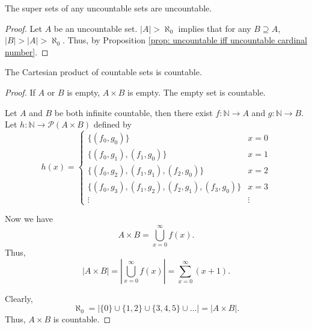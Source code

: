 \begin{proposition}
	The super sets of any uncountable sets are uncountable.
	
	\begin{proof}
		Let $A$ be an uncountable set. $|A| > \aleph_0$ implies that for any $B \supseteq A$, $|B| > |A| > \aleph_0$. Thus, by Proposition \ref{prop: uncountable iff uncountable cardinal number}.
	\end{proof}
\end{proposition}


\begin{proposition}
	\label{prop: The Cartesian product of countable sets is countable}
    The Cartesian product of countable sets is countable.
    
    \begin{proof}
    	If $A$ or $B$ is empty, $A \times B$ is empty. The empty set is countable.
    	
    	Let $A$ and $B$ be both infinite countable, then there exist $f: \mathbb N \to A$ and $g: \mathbb N \to B$. Let $h: \mathbb N \to \mathcal P(A \times B)$ defined by
    	$$
        h(x) =
        \begin{cases}
        \{(f_0, g_0)\} & x = 0 \\
        \{(f_0, g_1), (f_1, g_0)\} & x = 1 \\
        \{(f_0, g_2), (f_1, g_1), (f_2, g_0)\} & x = 2 \\
        \{(f_0, g_3), (f_1, g_2), (f_2, g_1), (f_3, g_0)\} & x = 3 \\
        \vdots & \vdots
        \end{cases}
        $$
        
        Now we have
        $$
        A \times B = \bigcup_{x = 0}^\infty f(x).
        $$
        Thus,
        $$
        |A \times B| = \left| \bigcup_{x = 0}^\infty f(x) \right| = \sum_{x = 0}^\infty (x + 1).
        $$
        
        Clearly,
        $$
        \aleph_0 = |\{0\} \cup \{1, 2\} \cup \{3,4,5\} \cup \ldots | = |A \times B|.
        $$
        Thus, $A\times B$ is countable.
    \end{proof}
\end{proposition}


